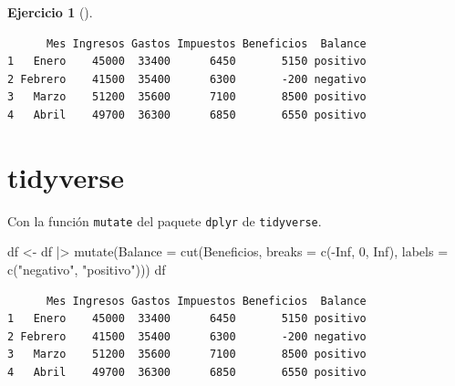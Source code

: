 \documentclass[
  spanish,
  a4paper,
]{scrreport}
\newenvironment{Shaded}{\begin{snugshade}}{\end{snugshade}}
\newcommand{\AttributeTok}[1]{\textcolor[rgb]{0.40,0.45,0.13}{#1}}
\newcommand{\ConstantTok}[1]{\textcolor[rgb]{0.56,0.35,0.01}{#1}}
\newcommand{\DecValTok}[1]{\textcolor[rgb]{0.68,0.00,0.00}{#1}}
\newcommand{\FunctionTok}[1]{\textcolor[rgb]{0.28,0.35,0.67}{#1}}
\newcommand{\NormalTok}[1]{\textcolor[rgb]{0.00,0.23,0.31}{#1}}
\newcommand{\OtherTok}[1]{\textcolor[rgb]{0.00,0.23,0.31}{#1}}
\newcommand{\SpecialCharTok}[1]{\textcolor[rgb]{0.37,0.37,0.37}{#1}}
\newcommand{\StringTok}[1]{\textcolor[rgb]{0.13,0.47,0.30}{#1}}
\theoremstyle{definition}
\newtheorem{exercise}{Ejercicio}[chapter]
\theoremstyle{remark}
\begin{document}
\begin{exercise}[]
\begin{enumerate}
\begin{tcolorbox}
\begin{Shaded}
\end{Shaded}

\begin{verbatim}
      Mes Ingresos Gastos Impuestos Beneficios  Balance
1   Enero    45000  33400      6450       5150 positivo
2 Febrero    41500  35400      6300       -200 negativo
3   Marzo    51200  35600      7100       8500 positivo
4   Abril    49700  36300      6850       6550 positivo
\end{verbatim}

  \section{tidyverse}

  Con la función \texttt{mutate} del paquete \texttt{dplyr} de
  \texttt{tidyverse}.

\begin{Shaded}
\begin{Highlighting}[]
\NormalTok{df }\OtherTok{\textless{}{-}}\NormalTok{ df }\SpecialCharTok{|\textgreater{}}
    \FunctionTok{mutate}\NormalTok{(}\AttributeTok{Balance =} \FunctionTok{cut}\NormalTok{(Beneficios, }\AttributeTok{breaks =} \FunctionTok{c}\NormalTok{(}\SpecialCharTok{{-}}\ConstantTok{Inf}\NormalTok{, }\DecValTok{0}\NormalTok{, }\ConstantTok{Inf}\NormalTok{), }\AttributeTok{labels =} \FunctionTok{c}\NormalTok{(}\StringTok{"negativo"}\NormalTok{, }\StringTok{"positivo"}\NormalTok{)))}
\NormalTok{df}
\end{Highlighting}
\end{Shaded}

\begin{verbatim}
      Mes Ingresos Gastos Impuestos Beneficios  Balance
1   Enero    45000  33400      6450       5150 positivo
2 Febrero    41500  35400      6300       -200 negativo
3   Marzo    51200  35600      7100       8500 positivo
4   Abril    49700  36300      6850       6550 positivo
\end{verbatim}


\end{tcolorbox}
\end{enumerate}
\end{exercise}
\end{document}
